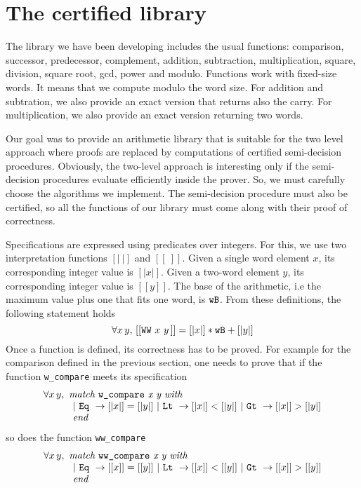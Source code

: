 \section{The certified library \label{Op}}
The library we have been developing includes the usual functions:
comparison, successor, predecessor, complement, addition, subtraction, 
multiplication, square, division, square root, gcd, power and modulo.
Functions work with fixed-size words. It means that we compute modulo
the word size. For addition and subtration, we also provide an exact version
that returns also the carry. For multiplication, we also provide an exact version
returning two words. 

Our goal was to provide an arithmetic library that is suitable for the two level
approach where proofs are replaced by computations of certified semi-decision procedures.
Obviously, the two-level approach is interesting only if the semi-decision procedures evaluate
efficiently inside the prover.
So, we must carefully choose the algorithms we implement.
The semi-decision procedure must also be certified, so  all the functions of our library must come 
along with their proof of correctness. 

Specifications are expressed 
using predicates over integers. For this, we use two interpretation functions
{$ [|\ |]$} and {$[[\ ]]$}.
Given a single word element $x$, its corresponding integer value
is $[|x|]$. Given a two-word element $y$, its corresponding
integer value is $[[y]]$. The base of the arithmetic, i.e
the maximum value plus one that fits  one word, is ${\texttt{wB}}$. From these definitions, the 
following statement holds
$$\forall x\, y,\, [[\texttt{WW}\,\,x\,\,y\,]] = [|x|] * {\texttt{wB}} + [|y|]$$
Once a function is defined, its correctness has to be proved.
For example for the comparison defined in the previous section,
one needs to prove that if the function {\tt w\_compare} meets its specification
$$\begin{array}{l}
\forall x\, y, \,\, \textit{match {\tt w\_compare} x y with} \\
\qquad\quad
 |\,\, \texttt{Eq}\,\, \rightarrow [|x|] = [|y|]\,\, | \,\,\texttt{Lt}\,\, \rightarrow [|x|] < [|y|] \,\,
| \,\,\texttt{Gt}\,\, \rightarrow [|x|] > [|y|]\\
\qquad\quad \textit{end}
\end{array}
$$
so does the function {\tt ww\_compare}
$$\begin{array}{l}
\forall x\, y, \,\, \textit{match {\tt ww\_compare} x y with} \\
\qquad\quad
 |\,\, \texttt{Eq}\,\, \rightarrow [[x]] = [[y]]\,\, | \,\,\texttt{Lt}\,\, \rightarrow [[x]] < [[y]] \,\,
| \,\,\texttt{Gt}\,\, \rightarrow [[x]] > [[y]]\\
\qquad\quad \textit{end}
\end{array}
$$

